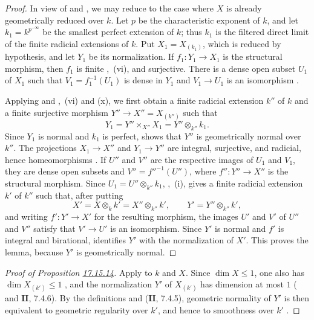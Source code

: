 \begin{proof}
In view of  and , we may reduce to the case where $X$ is already geometrically reduced over $k$.  Let $p$ be the characteristic exponent of $k$, and let $k_1=k^{p^{-\infty}}$ be the smallest perfect extension of $k$; thus $k_1$ is the filtered direct limit of the finite radicial extensions of $k$.  Put $X_1=X_{(k_1)}$, which is reduced by hypothesis, and let $Y_1$ be its normalization.  If $f_1:Y_1\to X_1$ is the structural morphism, then $f_1$ is finite ,~(vi), and surjective.  There is a dense open subset $U_1$ of $X_1$ such that $V_1=f_1^{-1}(U_1)$ is dense in $Y_1$ and
$V_1\to U_1$ is an isomorphism .

Applying  and ,~(vi) and (x), we first obtain a finite radicial extension $k''$ of $k$ and a finite surjective morphism $Y''\to X''=X_{(k'')}$ such that
\[
 Y_1=Y''\times_{X''}X_1=Y''\otimes_{k''}k_1.
\]
Since $Y_1$ is normal and $k_1$ is perfect,  shows that $Y''$ is geometrically normal over $k''$.  The projections $X_1\to X''$ and $Y_1\to Y''$ are integral, surjective, and radicial, hence homeomorphisms .  If $U''$ and $V''$ are the respective images of $U_1$ and $V_1$, they are dense open subsets and $V''=f''^{-1}(U'')$, where $f'':Y''\to X''$ is the structural morphism.  Since $U_1=U''\otimes_{k''}k_1$, ,~(i), gives a finite radicial extension $k'$ of $k''$ such that, after putting
\[
 X'=X\otimes_k k'=X''\otimes_{k''}k',\qquad
 Y'=Y''\otimes_{k''}k',
\]
and writing $f':Y'\to X'$ for the resulting morphism, the images $U'$ and $V'$ of $U''$ and $V''$ satisfy that $V'\to U'$ is an isomorphism.  Since $Y'$ is normal and $f'$ is integral and birational,  identifies $Y'$ with the normalization of $X'$.  This proves the lemma, because $Y'$ is geometrically normal.
\end{proof}

\begin{proof}[Proof of Proposition \textup{{\hyperlink{ega4.c04.prop.17-15-14}{17.15.14}}}]
Apply  to $k$ and $X$.  Since $\dim X\leq1$, one also has $\dim X_{(k')}\leq1$ , and the normalization $Y'$ of $X_{(k')}$ has dimension at most $1$ ( and $\mathbf{II}$, 7.4.6).  By the definitions and ($\mathbf{II}$, 7.4.5), geometric normality of $Y'$ is then equivalent to geometric regularity over $k'$, and hence to smoothness over $k'$ .
\end{proof}

